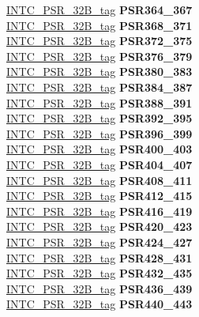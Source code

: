 \begin{DoxyCompactItemize}
\begin{tabbing}
\>\>\mbox{\hyperlink{unionINTC__PSR__32B__tag}{INTC\_PSR\_32B\_tag}} {\bfseries PSR364\_367}\\
\>\>\mbox{\hyperlink{unionINTC__PSR__32B__tag}{INTC\_PSR\_32B\_tag}} {\bfseries PSR368\_371}\\
\>\>\mbox{\hyperlink{unionINTC__PSR__32B__tag}{INTC\_PSR\_32B\_tag}} {\bfseries PSR372\_375}\\
\>\>\mbox{\hyperlink{unionINTC__PSR__32B__tag}{INTC\_PSR\_32B\_tag}} {\bfseries PSR376\_379}\\
\>\>\mbox{\hyperlink{unionINTC__PSR__32B__tag}{INTC\_PSR\_32B\_tag}} {\bfseries PSR380\_383}\\
\>\>\mbox{\hyperlink{unionINTC__PSR__32B__tag}{INTC\_PSR\_32B\_tag}} {\bfseries PSR384\_387}\\
\>\>\mbox{\hyperlink{unionINTC__PSR__32B__tag}{INTC\_PSR\_32B\_tag}} {\bfseries PSR388\_391}\\
\>\>\mbox{\hyperlink{unionINTC__PSR__32B__tag}{INTC\_PSR\_32B\_tag}} {\bfseries PSR392\_395}\\
\>\>\mbox{\hyperlink{unionINTC__PSR__32B__tag}{INTC\_PSR\_32B\_tag}} {\bfseries PSR396\_399}\\
\>\>\mbox{\hyperlink{unionINTC__PSR__32B__tag}{INTC\_PSR\_32B\_tag}} {\bfseries PSR400\_403}\\
\>\>\mbox{\hyperlink{unionINTC__PSR__32B__tag}{INTC\_PSR\_32B\_tag}} {\bfseries PSR404\_407}\\
\>\>\mbox{\hyperlink{unionINTC__PSR__32B__tag}{INTC\_PSR\_32B\_tag}} {\bfseries PSR408\_411}\\
\>\>\mbox{\hyperlink{unionINTC__PSR__32B__tag}{INTC\_PSR\_32B\_tag}} {\bfseries PSR412\_415}\\
\>\>\mbox{\hyperlink{unionINTC__PSR__32B__tag}{INTC\_PSR\_32B\_tag}} {\bfseries PSR416\_419}\\
\>\>\mbox{\hyperlink{unionINTC__PSR__32B__tag}{INTC\_PSR\_32B\_tag}} {\bfseries PSR420\_423}\\
\>\>\mbox{\hyperlink{unionINTC__PSR__32B__tag}{INTC\_PSR\_32B\_tag}} {\bfseries PSR424\_427}\\
\>\>\mbox{\hyperlink{unionINTC__PSR__32B__tag}{INTC\_PSR\_32B\_tag}} {\bfseries PSR428\_431}\\
\>\>\mbox{\hyperlink{unionINTC__PSR__32B__tag}{INTC\_PSR\_32B\_tag}} {\bfseries PSR432\_435}\\
\>\>\mbox{\hyperlink{unionINTC__PSR__32B__tag}{INTC\_PSR\_32B\_tag}} {\bfseries PSR436\_439}\\
\>\>\mbox{\hyperlink{unionINTC__PSR__32B__tag}{INTC\_PSR\_32B\_tag}} {\bfseries PSR440\_443}\\

\end{tabbing}
\end{DoxyCompactItemize}
